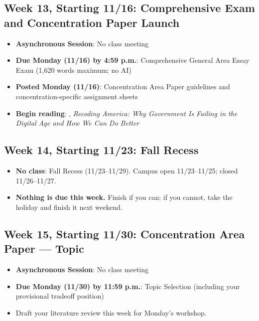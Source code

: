 \documentclass[11pt]{article}     %
\begin{document}
\subsection*{Week 13, Starting 11/16: Comprehensive Exam and Concentration Paper Launch}
\begin{itemize}
    \item \textbf{Asynchronous Session}: No class meeting
    \item \textbf{Due Monday (11/16) by 4:59 p.m.}: Comprehensive General Area Essay Exam (1,620 words maximum; no AI)
    \item \textbf{Posted Monday (11/16)}: Concentration Area Paper guidelines and concentration-specific assignment sheets
    \item \textbf{Begin reading}: \citet{pahlka2023}, \emph{Recoding America: Why Government Is Failing in the Digital Age and How We Can Do Better}
\end{itemize}

\subsection*{Week 14, Starting 11/23: Fall Recess}
\begin{itemize}
    \item \textbf{No class}: Fall Recess (11/23--11/29). Campus open 11/23--11/25; closed 11/26--11/27.
    \item \textbf{Nothing is due this week.} Finish \citet{pahlka2023} if you can; if you cannot, take the holiday and finish it next weekend.
\end{itemize}

\subsection*{Week 15, Starting 11/30: Concentration Area Paper --- Topic}
\begin{itemize}
    \item \textbf{Asynchronous Session}: No class meeting
    \item \textbf{Due Monday (11/30) by 11:59 p.m.}: Topic Selection (including your provisional tradeoff position)
    \item Draft your literature review this week for Monday's workshop.
\end{itemize}
\end{document}
